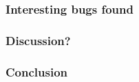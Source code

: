 \begin{frame}
	\frametitle{Interesting bugs found}
\end{frame}


\begin{frame}
	\frametitle{Discussion?}
\end{frame}


\begin{frame}
	\frametitle{Conclusion}
\end{frame}

